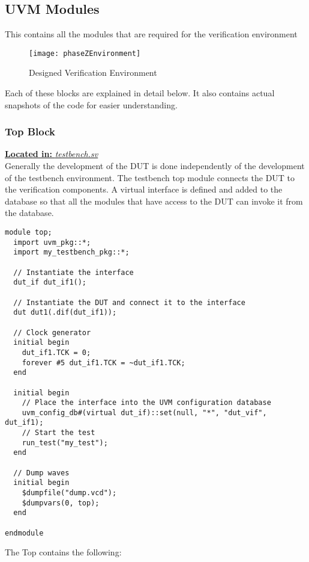 \documentclass[a4paper,11pt]{article}
\begin{document}
\subsection{UVM Modules}
This contains all the modules that are required for the verification environment
\begin{figure}[ht]
\centering
\texttt{[image: phaseZEnvironment]}
\caption{Designed Verification Environment}
\label{fig: Designed Verification Environment}
\end{figure}

Each of these blocks are explained in detail below. It also contains actual snapshots of the code for easier understanding.

\FloatBarrier
\subsubsection{Top Block}
\underline{\textbf{Located in:} \textit{testbench.sv}}\\

Generally the development of the DUT is done independently of the development of the testbench environment. The testbench top module connects the DUT to the verification components. A virtual interface is defined and added to the database so that all the modules that have access to the DUT can invoke it from the database.

\begin{lstlisting}[style={verilog-style}, backgroundcolor=\color{lightgray}]
module top;
  import uvm_pkg::*;
  import my_testbench_pkg::*;
  
  // Instantiate the interface
  dut_if dut_if1();
  
  // Instantiate the DUT and connect it to the interface
  dut dut1(.dif(dut_if1));
  
  // Clock generator
  initial begin
    dut_if1.TCK = 0;
    forever #5 dut_if1.TCK = ~dut_if1.TCK;
  end
  
  initial begin
    // Place the interface into the UVM configuration database
    uvm_config_db#(virtual dut_if)::set(null, "*", "dut_vif", dut_if1);
    // Start the test
    run_test("my_test");
  end
  
  // Dump waves
  initial begin
    $dumpfile("dump.vcd");
    $dumpvars(0, top);
  end
  
endmodule
\end{lstlisting}

The Top contains the following:
\end{document}
